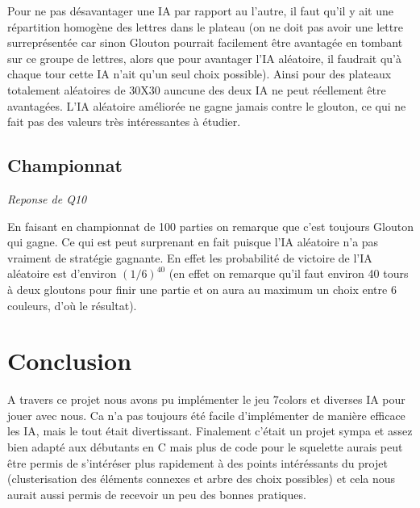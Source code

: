 \documentclass[a4paper,11pt]{article}
\begin{document}
Pour ne pas désavantager une IA par rapport au l'autre, il faut qu'il y ait une répartition homogène des lettres dans le plateau (on ne doit pas avoir une lettre surreprésentée car sinon Glouton pourrait facilement être avantagée en tombant sur ce groupe de lettres, alors que pour avantager l'IA aléatoire, il faudrait qu'à chaque tour cette IA n'ait qu'un seul choix possible). Ainsi pour des plateaux totalement aléatoires de 30X30 auncune des deux IA ne peut réellement être avantagées. L'IA aléatoire améliorée ne gagne jamais contre le glouton, ce qui ne fait pas des valeurs très intéressantes à étudier.

\subsection{Championnat}
\emph{Reponse de Q10}

En faisant en championnat de 100 parties on remarque que c'est toujours Glouton qui gagne. Ce qui est peut surprenant en fait puisque l'IA aléatoire n'a pas vraiment de stratégie gagnante. En effet les probabilité de victoire de l'IA aléatoire est d'environ ${(1/6)}^{40}$ (en effet on remarque qu'il faut environ 40 tours à deux gloutons pour finir une partie et on aura au maximum un choix entre 6 couleurs, d'où le résultat).

\section{Conclusion}

A travers ce projet nous avons pu implémenter le jeu 7colors et diverses IA
pour jouer avec nous. Ca n'a pas toujours été facile d'implémenter de manière
efficace les IA, mais le tout était divertissant. 
Finalement c'était un projet sympa et assez bien adapté aux débutants en C mais plus de code pour le squelette aurais peut être permis de s'intéréser plus rapidement à des points intéréssants du projet (clusterisation des éléments connexes et arbre des choix possibles) et cela nous aurait aussi permis de recevoir un peu des bonnes pratiques.
\end{document}
